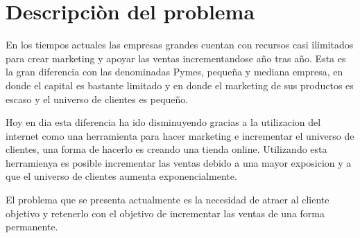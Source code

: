 \section{Descripciòn del problema}

En los tiempos actuales las empresas grandes cuentan con recursos casi ilimitados para crear marketing 
y apoyar las ventas incrementandose año tras año. Esta es la gran diferencia con las denominadas Pymes, 
pequeña y mediana empresa, en donde el capital es bastante limitado y en donde el marketing de sus productos
es escaso y el universo de clientes es pequeño.

Hoy en dia esta diferencia ha ido disminuyendo gracias a la utilizacion del internet como una herramienta
 para hacer marketing e incrementar el universo de clientes, una forma de hacerlo es creando una tienda 
online. Utilizando esta herramienya es posible incrementar las ventas debido a una mayor exposicion y a que el universo de clientes aumenta exponencialmente. 

El problema que se presenta actualmente es la necesidad de atraer al cliente objetivo y retenerlo 
con el objetivo de incrementar las ventas de una forma permanente. 
